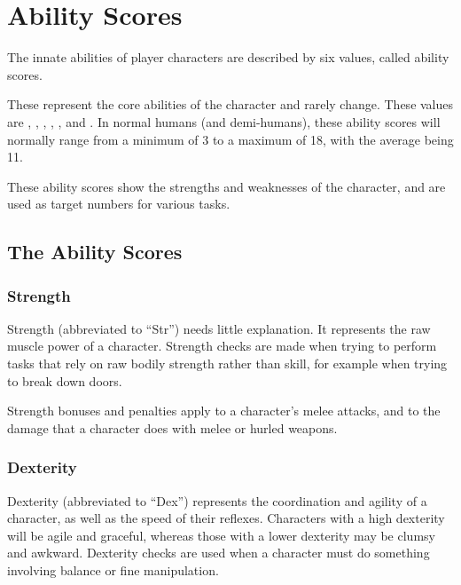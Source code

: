 \chapter[red]{Ability Scores}
\label{chap:Ability Scores}
\thispagestyle{plain}

\begin{multicols*}{2}
The innate abilities of player characters are described by six values, called ability scores.

These represent the core abilities of the character and rarely change. These values are , , , , , and . In normal humans (and demi-humans), these ability scores will normally range from a minimum of 3 to a maximum of 18, with the average being 11.

These ability scores show the strengths and weaknesses of the character, and are used as target numbers for various tasks.

\section{The Ability Scores}
\subsection{Strength}\label{sec:Strength}
Strength (abbreviated to “Str”) needs little explanation. It represents the raw muscle power of a character. Strength checks are made when trying to perform tasks that rely on raw bodily strength rather than skill, for example when trying to break down doors.

Strength bonuses and penalties apply to a character’s melee attacks, and to the damage that a character does with melee or hurled weapons.

\subsection{Dexterity}\label{sec:Dexterity}
Dexterity (abbreviated to “Dex”) represents the coordination and agility of a character, as well as the speed of their reflexes. Characters with a high dexterity will be agile and graceful, whereas those with a lower dexterity may be clumsy and awkward. Dexterity checks are used when a character must do something involving balance or fine manipulation.


\end{multicols*}
